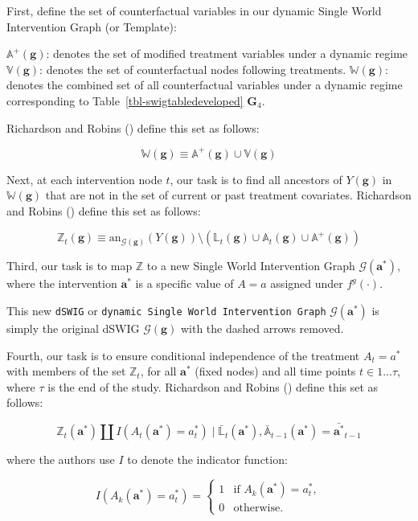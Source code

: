 \documentclass[
  single column]{article}
\begin{document}
First, define the set of counterfactual variables in our dynamic Single
World Intervention Graph (or Template):

\(\mathbb{A}^+(\mathbf{g})\): denotes the set of modified treatment
variables under a dynamic regime \(\mathbb{V}(\mathbf{g})\): denotes the
set of counterfactual nodes following treatments.
\(\mathbb{W}(\mathbf{g})\): denotes the combined set of all
counterfactual variables under a dynamic regime corresponding to
Table~\ref{tbl-swigtabledeveloped} \(\mathbf{G}_4\).

Richardson and Robins () define this
set as follows:

\[
\mathbb{W}(\mathbf{g}) \equiv \mathbb{A}^+(\mathbf{g}) \cup \mathbb{V}(\mathbf{g})
\]

Next, at each intervention node \(t\), our task is to find all ancestors
of \(Y(\mathbf{g})\) in \(\mathbb{W}(\mathbf{g})\) that are not in the
set of current or past treatment covariates. Richardson and Robins
() define this set as follows:

\[
\mathbb{Z}_t(\mathbf{g}) \equiv \text{an}_{\mathcal{G}(\mathbf{g})}(Y(\mathbf{g})) \setminus (\mathbb{L}_t(\mathbf{g}) \cup \mathbb{A}_t(\mathbf{g}) \cup \mathbb{A}^+(\mathbf{g}))
\]

Third, our task is to map \(\mathbb{Z}\) to a new Single World
Intervention Graph \(\mathcal{G}(\mathbf{a}^*)\), where the intervention
\(\mathbf{a}^*\) is a specific value of \(A = a\) assigned under
\(f^g(\cdot)\).

This new \texttt{dSWIG} or
\texttt{dynamic\ Single\ World\ Intervention\ Graph}
\(\mathcal{G}(\mathbf{a}^*)\) is simply the original dSWIG
\(\mathcal{G}(\mathbf{g})\) with the dashed arrows removed.

Fourth, our task is to ensure conditional independence of the treatment
\(A_t = a^*\) with members of the set \(\mathbb{Z}_t\), for all
\(\mathbf{a}^*\) (fixed nodes) and all time points \(t \in 1...\tau\),
where \(\tau\) is the end of the study. Richardson and Robins
() define this set as follows:

\[
\mathbb{Z}_t(\mathbf{a}^*) \coprod I(A_t(\mathbf{a}^*) = a^*_t) \mid \bar{\mathbb{L}}_t(\mathbf{a}^*), \bar{\mathbb{A}}_{t-1}(\mathbf{a}^*) = \bar{\mathbf{a}^*}_{t-1}
\]

where the authors use \(I\) to denote the indicator function:

\[
I(A_k(\mathbf{a}^*) = a^*_t) = 
\begin{cases} 
1 & \text{if } A_k(\mathbf{a}^*) = a^*_t, \\
0 & \text{otherwise}.
\end{cases}
\]
\end{document}
